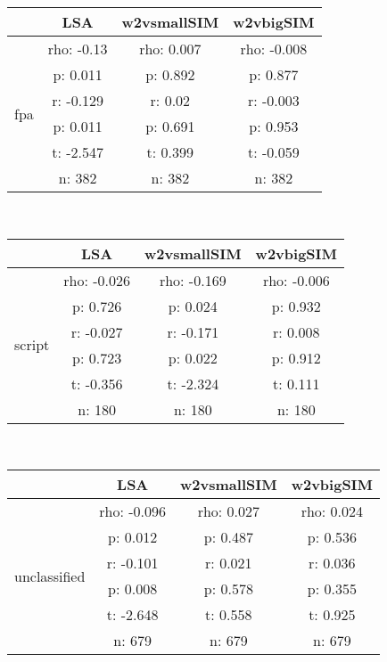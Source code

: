 \documentclass{article}
\begin{document}
\begin{tabular}{cccc|}\cline{2-4}
&\multicolumn{1}{|c}{LSA} & w2vsmallSIM & w2vbigSIM \\\hline
\multicolumn{1}{|c|}{\multirow{6}{*}{fpa}} & rho: -0.13 & rho: 0.007 & rho: -0.008 \\
\multicolumn{1}{|c|}{} & p: 0.011 & p: 0.892 & p: 0.877 \\
\multicolumn{1}{|c|}{} & r: -0.129 & r: 0.02 & r: -0.003 \\
\multicolumn{1}{|c|}{} & p: 0.011 & p: 0.691 & p: 0.953 \\
\multicolumn{1}{|c|}{} & t: -2.547 & t: 0.399 & t: -0.059 \\
\multicolumn{1}{|c|}{} & n: 382 & n: 382 & n: 382 \\
\hline
\end{tabular}\\
\begin{tabular}{cccc|}\cline{2-4}
&\multicolumn{1}{|c}{LSA} & w2vsmallSIM & w2vbigSIM \\\hline
\multicolumn{1}{|c|}{\multirow{6}{*}{script}} & rho: -0.026 & rho: -0.169 & rho: -0.006 \\
\multicolumn{1}{|c|}{} & p: 0.726 & p: 0.024 & p: 0.932 \\
\multicolumn{1}{|c|}{} & r: -0.027 & r: -0.171 & r: 0.008 \\
\multicolumn{1}{|c|}{} & p: 0.723 & p: 0.022 & p: 0.912 \\
\multicolumn{1}{|c|}{} & t: -0.356 & t: -2.324 & t: 0.111 \\
\multicolumn{1}{|c|}{} & n: 180 & n: 180 & n: 180 \\
\hline
\end{tabular}\\
\begin{tabular}{cccc|}\cline{2-4}
&\multicolumn{1}{|c}{LSA} & w2vsmallSIM & w2vbigSIM \\\hline
\multicolumn{1}{|c|}{\multirow{6}{*}{unclassified}} & rho: -0.096 & rho: 0.027 & rho: 0.024 \\
\multicolumn{1}{|c|}{} & p: 0.012 & p: 0.487 & p: 0.536 \\
\multicolumn{1}{|c|}{} & r: -0.101 & r: 0.021 & r: 0.036 \\
\multicolumn{1}{|c|}{} & p: 0.008 & p: 0.578 & p: 0.355 \\
\multicolumn{1}{|c|}{} & t: -2.648 & t: 0.558 & t: 0.925 \\
\multicolumn{1}{|c|}{} & n: 679 & n: 679 & n: 679 \\
\hline
\end{tabular}\\
\end{document}
